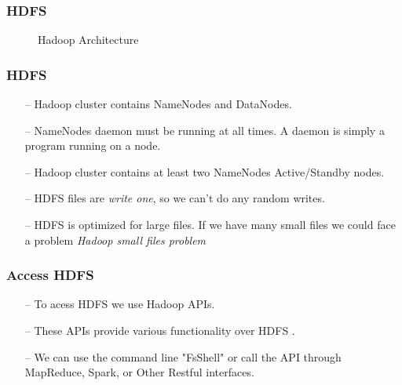 \begin{frame}[c]{ }
	\frametitle{HDFS }
		\begin{figure}
		\centering
		
		\caption{Hadoop Architecture } \label{fig:hdfs}
	\end{figure}
\end{frame}
\begin{frame}[c]{ }
	\frametitle{HDFS }
	
	
	\begin{itemize}  [<+->]
		\item [--] {\footnotesize Hadoop cluster contains NameNodes and DataNodes.}
		\item [--] {\footnotesize NameNodes daemon must be running at all times. A daemon is simply a program running on a node. }
		\item [--] {\footnotesize Hadoop cluster contains at least two NameNodes Active/Standby nodes.}
		\item [--] {\footnotesize HDFS files are \textit{write one}, so we can't do any random writes.}
		\item [--] {\footnotesize HDFS is optimized for large files. If we have many small files we could face a problem \textit{Hadoop small files problem}}
			\end{itemize}
		
\end{frame}
\begin{frame}[c]{ }
	\frametitle{Access HDFS }
	
	
	\begin{itemize}  [<+->]
		\item [--] {\footnotesize To acess HDFS we use Hadoop APIs. }
		\item [--] {\footnotesize These APIs provide various functionality over HDFS . }
		\item [--] {\footnotesize We can use the command line "FsShell" or call the API through MapReduce, Spark, or Other Restful interfaces.}
		
		
	\end{itemize}
	
\end{frame}
